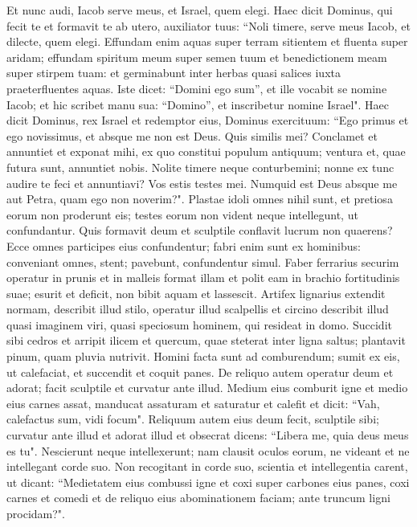 \begin{biblechapter}  
\verse Et nunc audi, Iacob serve meus, et Israel, quem elegi. 
\verse Haec dicit Dominus, qui fecit te et formavit te ab utero, auxiliator tuus: “Noli timere, serve meus Iacob, et dilecte, quem elegi. 
\verse Effundam enim aquas super terram sitientem et fluenta super aridam; effundam spiritum meum super semen tuum et benedictionem meam super stirpem tuam: 
\verse et germinabunt inter herbas quasi salices iuxta praeterfluentes aquas. 
\verse Iste dicet: “Domini ego sum”, et ille vocabit se nomine Iacob; et hic scribet manu sua: “Domino”, et inscribetur nomine Israel". 
\verse Haec dicit Dominus, rex Israel et redemptor eius, Dominus exercituum: “Ego primus et ego novissimus, et absque me non est Deus. 
\verse Quis similis mei? Conclamet et annuntiet et exponat mihi, ex quo constitui populum antiquum; ventura et, quae futura sunt, annuntiet nobis. 
\verse Nolite timere neque conturbemini; nonne ex tunc audire te feci et annuntiavi? Vos estis testes mei. Numquid est Deus absque me aut Petra, quam ego non noverim?". 
\verse Plastae idoli omnes nihil sunt, et pretiosa eorum non proderunt eis; testes eorum non vident neque intellegunt, ut confundantur. 
\verse Quis formavit deum et sculptile conflavit lucrum non quaerens? 
\verse Ecce omnes participes eius confundentur; fabri enim sunt ex hominibus: conveniant omnes, stent; pavebunt, confundentur simul. 
\verse Faber ferrarius securim operatur in prunis et in malleis format illam et polit eam in brachio fortitudinis suae; esurit et deficit, non bibit aquam et lassescit. 
\verse Artifex lignarius extendit normam, describit illud stilo, operatur illud scalpellis et circino describit illud quasi imaginem viri, quasi speciosum hominem, qui resideat in domo. 
\verse Succidit sibi cedros et arripit ilicem et quercum, quae steterat inter ligna saltus; plantavit pinum, quam pluvia nutrivit. 
\verse Homini facta sunt ad comburendum; sumit ex eis, ut calefaciat, et succendit et coquit panes. De reliquo autem operatur deum et adorat; facit sculptile et curvatur ante illud. 
\verse Medium eius comburit igne et medio eius carnes assat, manducat assaturam et saturatur et calefit et dicit: “Vah, calefactus sum, vidi focum". 
\verse Reliquum autem eius deum fecit, sculptile sibi; curvatur ante illud et adorat illud et obsecrat dicens: “Libera me, quia deus meus es tu". 
\verse Nescierunt neque intellexerunt; nam clausit oculos eorum, ne videant et ne intellegant corde suo. 
\verse Non recogitant in corde suo, scientia et intellegentia carent, ut dicant: “Medietatem eius combussi igne et coxi super carbones eius panes, coxi carnes et comedi et de reliquo eius abominationem faciam; ante truncum ligni procidam?". 

\end{biblechapter}

